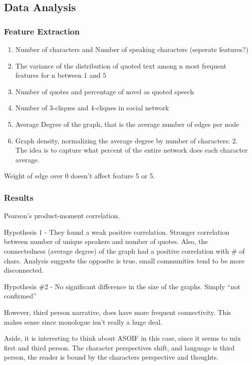 \documentclass{report}\usepackage[]{graphicx}\usepackage[]{color}
\begin{document}
{\subsection{Data Analysis}

\subsubsection{Feature Extraction}

\begin{enumerate}
\item
  Number of characters and Number of speaking characters (seperate features?)
\item
  The variance of the distribution of quoted text among n most frequent features for n between 1 and 5
\item
  Number of quotes and percentage of novel as quoted speech
\item
  Number of 3-cliques and 4-cliques in social network
\item
  Average Degree of the graph, that is the average number of edges per
  node
\item
  Graph density, normalizing the average degree by number of characters: 2.
  The idea is to capture what percent of the entire network does each character average.
\end{enumerate}

Weight of edge over 0 doesn't affect feature 5 or 5.

\subsubsection{Results}

Pearson's product-moment correlation.

Hypothesis 1 - They found a weak positive correlation. Stronger
correlation between number of unique speakers and number of quotes.
Also, the connectedness (average degree) of the graph had a positive
correlation with \# of chars. Analysis suggests the opposite is true,
small communities tend to be more disconnected.

Hypothesis \#2 - No significant difference in the size of the graphs.
Simply ``not confirmed''

However, third person narrative, does have more frequent connectivity.
This makes sense since monologue isn't really a huge deal.

Aside, it is interesting to think about ASOIF in this case, since it seems to mix first and third person. The character perspectives shift, and language is third person, the reader is bound by the characters perspective and thoughts.


}
\end{document}
